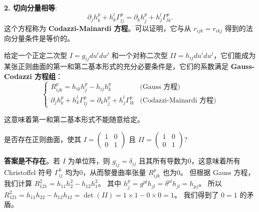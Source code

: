 \documentclass[lang=cn,10pt,thmcnt=section]{elegantbook}
\begin{document}
\textbf{2. 切向分量相等}:
\[
\partial_j h_k^p + h_k^l \Gamma_{lj}^p = \partial_k h_j^p + h_j^l \Gamma_{lk}^p.
\]
这个方程称为 \textbf{Codazzi-Mainardi 方程}。可以证明，它与从 $r_{ijk}=r_{ikj}$ 得到的法向分量条件是等价的。

\begin{theorem}[曲面论基本定理]
    给定一个正定二次型 $I = g_{ij} du^i du^j$ 和一个对称二次型 $II = h_{ij} du^i du^j$，它们能成为某张正则曲面的第一和第二基本形式的充分必要条件是，它们的系数满足 \textbf{Gauss-Codazzi 方程组}：
    \[
    \begin{cases} 
    R_{ijk}^p = h_{ik} h_j^p - h_{ij} h_k^p & \text{(Gauss 方程)} \\
    \partial_j h_k^p + h_k^l \Gamma_{lj}^p = \partial_k h_j^p + h_j^l \Gamma_{lk}^p & \text{(Codazzi-Mainardi 方程)}
    \end{cases}
    \]
\end{theorem}
这意味着第一和第二基本形式不能随意给定。

\begin{example}
    是否存在正则曲面，使其 $I = \begin{pmatrix} 1&0\\0&1 \end{pmatrix}$ 且 $II = \begin{pmatrix} 1&0\\0&1 \end{pmatrix}$?
    
    \textbf{答案是不存在}。若 $I$ 为单位阵，则 $g_{ij}=\delta_{ij}$ 且其所有导数为0，这意味着所有 Christoffel 符号 $\Gamma_{ij}^k$ 均为0，从而黎曼曲率张量 $R_{ijk}^p$ 也为0。
    但根据 Gauss 方程，我们计算 $R_{121}^2 = h_{11}h_2^2 - h_{12}h_1^2$。
    其中 $h_j^p=g^{pl}h_{jl}=\delta^{pl}h_{jl}=h_{pj}$。
    所以 $R_{121}^2 = h_{11}h_{22}-h_{12}h_{12} = \det(II) = 1 \times 1 - 0 \times 0 = 1$。
    我们得到了 $0=1$ 的矛盾。
\end{example}
\end{document}
